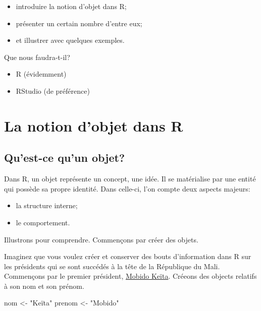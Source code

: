 \documentclass[]{book}
\newenvironment{Shaded}{\begin{snugshade}}{\end{snugshade}}
\newcommand{\StringTok}[1]{\textcolor[rgb]{0.31,0.60,0.02}{#1}}
\newcommand{\NormalTok}[1]{#1}
\begin{document}
\begin{itemize}
\item
  introduire la notion d'objet dans R;
\item
  présenter un certain nombre d'entre eux;
\item
  et illustrer avec quelques exemples.
\end{itemize}

Que nous faudra-t-il?

\begin{itemize}
\item
  R (évidemment)
\item
  RStudio (de préférence)
\end{itemize}

\section{La notion d'objet dans R}\label{la-notion-dobjet-dans-r}

\subsection{Qu'est-ce qu'un objet?}\label{quest-ce-quun-objet}

Dans R, un objet représente un concept, une idée. Il se matérialise par
une entité qui possède sa propre identité. Dans celle-ci, l'on compte
deux aspects majeurs:

\begin{itemize}
\item
  la structure interne;
\item
  le comportement.
\end{itemize}

Illustrons pour comprendre. Commençons par créer des objets.

Imaginez que vous voulez créer et conserver des bouts d'information dans
R sur les présidents qui se sont succédés à la tête de la République du
Mali. Commençons par le premier président,
\href{https://fr.wikipedia.org/wiki/Modibo_Ke\%C3\%AFta_(1915-1977)}{Mobido
Keïta}. Créeons des objects relatifs à son nom et son prénom.

\begin{Shaded}
\begin{Highlighting}[]
\NormalTok{nom <-}\StringTok{ "Keïta"}
\NormalTok{prenom <-}\StringTok{ "Mobido"}
\end{Highlighting}
\end{Shaded}
\end{document}
